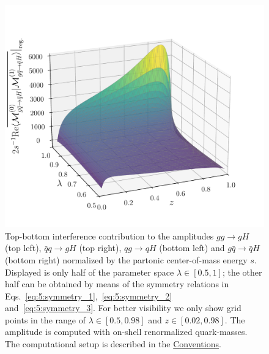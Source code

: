 \begin{figure}[ht]
\begin{minipage}[t]{0.49\textwidth}
  \centering
  \includegraphics[width=\textwidth]{Images/RV_amplitudes/tOSbOS_gqB.pdf}
  \end{minipage}
  \caption{Top-bottom interference contribution to the amplitudes $gg \rightarrow gH$ (top left), $\bar{q}q \rightarrow g H$ (top right), $qg \rightarrow q H$ (bottom left) and $g \bar{q} \rightarrow \bar{q}H$ (bottom right) normalized by the partonic center-of-mass energy $s$. Displayed is only half of the parameter space $\lambda \in [0.5, 1]$; the other half can be obtained by means of the symmetry relations in Eqs.~\eqref{eq:5:symmetry_1},\ \eqref{eq:5:symmetry_2} and\ \eqref{eq:5:symmetry_3}. For better visibility we only show grid points in the range of $\lambda \in [0.5, 0.98]$ and $z \in [0.02, 0.98]$. The amplitude is computed with on-shell renormalized quark-masses. The computational setup is described in the \hyperref[chap:notation_and_conventions]{Conventions}.}
  \label{fig:5:RV_tOSbOS}
\end{figure}
%
